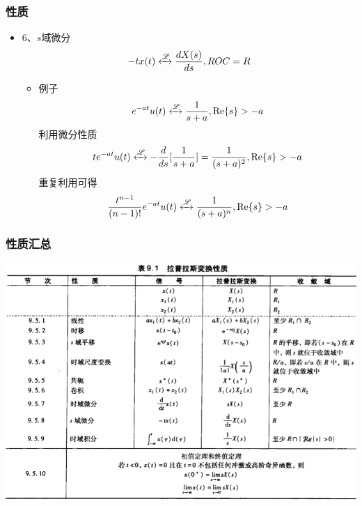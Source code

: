 \documentclass[CJKutf8,dvipsnames,table]{beamer}
\begin{document}
\begin{CJK*}{UTF8}{song}
  \begin{frame}
    \frametitle{性质}
    \begin{itemize}
    \item 6、$s$域微分
    \[
    -tx(t) \xleftrightarrow{\mathscr{L}} \frac{dX(s)}{ds}, ROC=R
    \]
    	\begin{itemize}
    	\item 例子
    	\[
    		e^{-at}u(t) \xleftrightarrow{\mathscr{L}} \frac{1}{s+a}, \operatorname{Re}\{s\} > -a     
    	\]
		利用微分性质
		\[
			te^{-at}u(t) \xleftrightarrow{\mathscr{L}} -\frac{d}{ds}[\frac{1}{s+a}]=\frac{1}{(s+a)^2}, \operatorname{Re}\{s\} > -a 
		\]
		重复利用可得
		\[
			\frac{t^{n-1}}{(n-1)!}e^{-at}u(t) \xleftrightarrow{\mathscr{L}} \frac{1}{(s+a)^n}, \operatorname{Re}\{s\} > -a 		
		\]    
    \end{itemize}
    \end{itemize}
  \end{frame}

  \begin{frame}
    \frametitle{性质汇总}
    \begin{center}
      \includegraphics[scale=.4]{ss-c-t9-1}
    \end{center}
  \end{frame}              
          

\end{CJK*}
\end{document}
